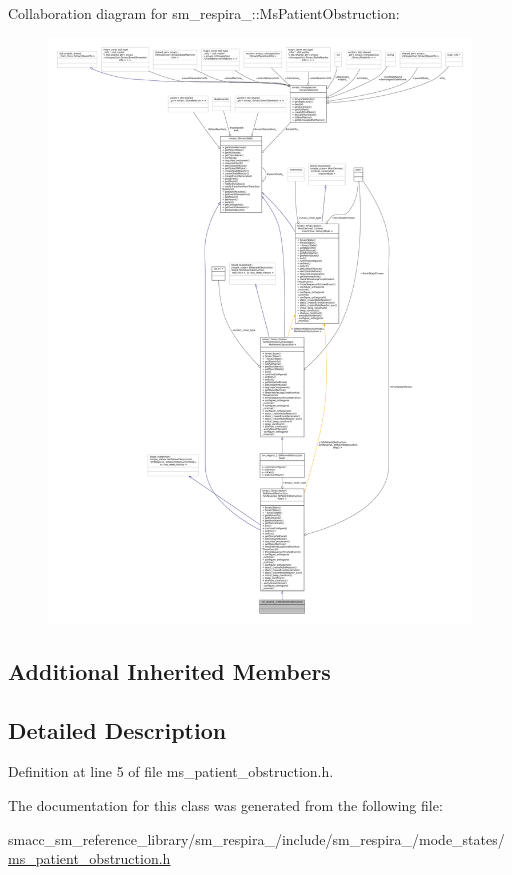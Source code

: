 Collaboration diagram for sm\+\_\+respira\+\_\+:\+:Ms\+Patient\+Obstruction\+:
\nopagebreak
\begin{figure}[H]
\begin{center}
\leavevmode
\includegraphics[width=350pt]{classsm__respira__1_1_1MsPatientObstruction__coll__graph}
\end{center}
\end{figure}
\subsection*{Additional Inherited Members}


\subsection{Detailed Description}


Definition at line 5 of file ms\+\_\+patient\+\_\+obstruction.\+h.



The documentation for this class was generated from the following file\+:\begin{DoxyCompactItemize}
\item 
smacc\+\_\+sm\+\_\+reference\+\_\+library/sm\+\_\+respira\+\_/include/sm\+\_\+respira\+\_/mode\+\_\+states/\hyperlink{ms__patient__obstruction_8h}{ms\+\_\+patient\+\_\+obstruction.\+h}\end{DoxyCompactItemize}
